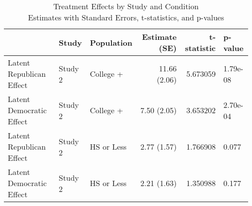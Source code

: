 \begin{table}[!t]
\caption*{
{\large Treatment Effects by Study and Condition} \\ 
{\small Estimates with Standard Errors, t-statistics, and p-values}
} 
\fontsize{12.0pt}{14.4pt}\selectfont
\begin{tabular*}{\linewidth}{@{\extracolsep{\fill}}l|llrrl}
\toprule
 & Study & Population & Estimate (SE) & t-statistic & p-value \\ 
\midrule\addlinespace[2.5pt]
Latent Republican Effect & Study 2 & College + & 11.66 (2.06) & 5.673059 & 1.79e-08 \\ 
Latent Democratic Effect & Study 2 & College + & 7.50 (2.05) & 3.653202 & 2.70e-04 \\ 
Latent Republican Effect & Study 2 & HS or Less & 2.77 (1.57) & 1.766908 & 0.077 \\ 
Latent Democratic Effect & Study 2 & HS or Less & 2.21 (1.63) & 1.350988 & 0.177 \\ 
\bottomrule
\end{tabular*}
\end{table}

